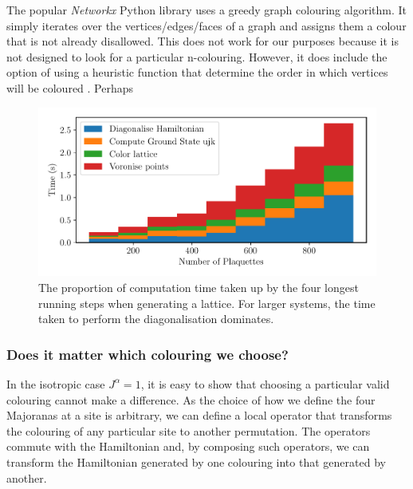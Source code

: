 The popular \emph{Networkx} Python library uses a greedy graph colouring algorithm. It simply iterates over the vertices/edges/faces of a graph and assigns them a colour that is not already disallowed. This does not work for our purposes because it is not designed to look for a particular n-colouring. However, it does include the option of using a heuristic function that determine the order in which vertices will be coloured \autocite{kosowski2004classical,matulaSmallestlastOrderingClustering1983}. Perhaps

\begin{figure}
\hypertarget{fig:times}{%
\centering
\includegraphics[width=1\textwidth,height=\textheight]{figure_code/amk_chapter/methods/times/times}
\caption[Computation Time Spent on Different Procedures.]{The proportion of computation time taken up by the four longest
running steps when generating a lattice. For larger systems, the time
taken to perform the diagonalisation dominates.}\label{fig:times}
}
\end{figure}

\hypertarget{does-it-matter-which-colouring-we-choose}{%
\subsubsection{Does it matter which colouring we choose?}\label{does-it-matter-which-colouring-we-choose}}

In the isotropic case \(J^\alpha = 1\), it is easy to show that choosing a particular valid colouring cannot make a difference. As the choice of how we define the four Majoranas at a site is arbitrary, we can define a local operator that transforms the colouring of any particular site to another permutation. The operators commute with the Hamiltonian and, by composing such operators, we can transform the Hamiltonian generated by one colouring into that generated by another.

